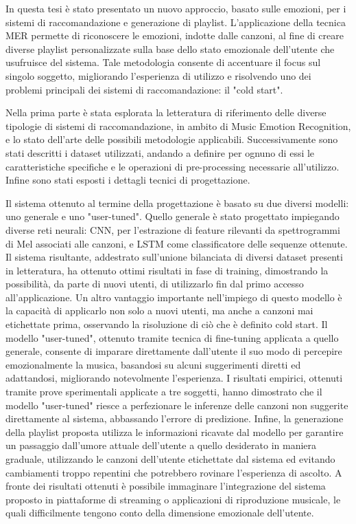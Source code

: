 \documentclass[11pt]{report}
\begin{document}
In questa tesi è stato presentato un nuovo approccio, basato sulle emozioni, per i sistemi di raccomandazione e generazione di playlist. L'applicazione della tecnica MER permette di riconoscere le emozioni, indotte dalle canzoni, al fine di creare diverse playlist personalizzate sulla base dello stato emozionale dell'utente che usufruisce del sistema. Tale metodologia consente di accentuare il focus sul singolo soggetto, migliorando l'esperienza di utilizzo e risolvendo uno dei problemi principali dei sistemi di raccomandazione: il "cold start". 

Nella prima parte è stata esplorata la letteratura di riferimento delle diverse tipologie di sistemi di raccomandazione, in ambito di Music Emotion Recognition, e lo stato dell'arte delle possibili metodologie applicabili. Successivamente sono stati descritti i dataset utilizzati, andando a definire per ognuno di essi le caratteristiche specifiche e le operazioni di pre-processing necessarie all'utilizzo. Infine sono stati esposti i dettagli tecnici di progettazione. 


Il sistema ottenuto al termine della progettazione è basato su due diversi modelli: uno generale e uno "user-tuned". Quello generale è stato progettato impiegando diverse reti neurali: CNN, per l'estrazione di feature rilevanti da spettrogrammi di Mel associati alle canzoni, e LSTM come classificatore delle sequenze ottenute. Il sistema risultante, addestrato sull'unione bilanciata di diversi dataset presenti in letteratura, ha ottenuto ottimi risultati in fase di training, dimostrando la possibilità, da parte di nuovi utenti, di utilizzarlo fin dal primo accesso all'applicazione. Un altro vantaggio importante nell'impiego di questo modello è la capacità di applicarlo non solo a nuovi utenti, ma anche a canzoni mai etichettate prima, osservando la risoluzione di ciò che è definito cold start. Il modello "user-tuned", ottenuto tramite tecnica di fine-tuning applicata a quello generale, consente di imparare direttamente dall'utente il suo modo di percepire emozionalmente la musica, basandosi su alcuni suggerimenti diretti ed adattandosi, migliorando notevolmente l'esperienza. I risultati empirici, ottenuti tramite prove sperimentali applicate a tre soggetti, hanno dimostrato che il modello "user-tuned" riesce a perfezionare le inferenze delle canzoni non suggerite direttamente al sistema, abbassando l'errore di predizione. Infine, la generazione della playlist proposta utilizza le informazioni ricavate dal modello per garantire un passaggio dall'umore attuale dell'utente a quello desiderato in maniera graduale, utilizzando le canzoni dell'utente etichettate dal sistema ed evitando cambiamenti troppo repentini che potrebbero rovinare l'esperienza di ascolto. A fronte dei risultati ottenuti è possibile immaginare l'integrazione del sistema proposto in piattaforme di streaming o applicazioni di riproduzione musicale, le quali difficilmente tengono conto della dimensione emozionale dell'utente.
\end{document}
